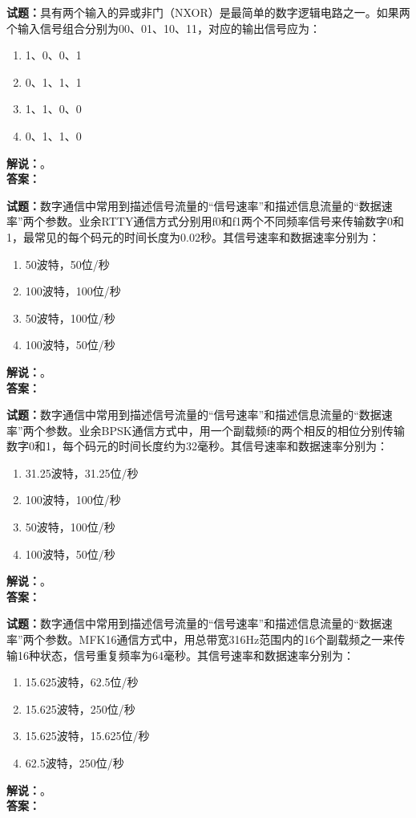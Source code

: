 \documentclass{ctexbook}
\begin{document}
\bigskip




\noindent\textbf{试题：}具有两个输入的异或非门（NXOR）是最简单的数字逻辑电路之一。如果两个输入信号组合分别为00、01、10、11，对应的输出信号应为：
\begin{enumerate}[leftmargin=3em]
\item 1、0、0、1
\item 0、1、1、1
\item 1、1、0、0
\item 0、1、1、0
\end{enumerate}
\noindent\textbf{解说：}\textbf{}。\\\noindent\textbf{答案：}

\bigskip




\noindent\textbf{试题：}数字通信中常用到描述信号流量的“信号速率”和描述信息流量的“数据速率”两个参数。业余RTTY通信方式分别用f0和f1两个不同频率信号来传输数字0和1，最常见的每个码元的时间长度为0.02秒。其信号速率和数据速率分别为：
\begin{enumerate}[leftmargin=3em]
\item 50波特，50位/秒
\item 100波特，100位/秒
\item 50波特，100位/秒
\item 100波特，50位/秒
\end{enumerate}
\noindent\textbf{解说：}\textbf{}。\\\noindent\textbf{答案：}

\bigskip




\noindent\textbf{试题：}数字通信中常用到描述信号流量的“信号速率”和描述信息流量的“数据速率”两个参数。业余BPSK通信方式中，用一个副载频f的两个相反的相位分别传输数字0和1，每个码元的时间长度约为32毫秒。其信号速率和数据速率分别为：
\begin{enumerate}[leftmargin=3em]
\item 31.25波特，31.25位/秒
\item 100波特，100位/秒
\item 50波特，100位/秒
\item 100波特，50位/秒
\end{enumerate}
\noindent\textbf{解说：}\textbf{}。\\\noindent\textbf{答案：}

\bigskip




\noindent\textbf{试题：}数字通信中常用到描述信号流量的“信号速率”和描述信息流量的“数据速率”两个参数。MFK16通信方式中，用总带宽316Hz范围内的16个副载频之一来传输16种状态，信号重复频率为64毫秒。其信号速率和数据速率分别为：
\begin{enumerate}[leftmargin=3em]
\item 15.625波特，62.5位/秒
\item 15.625波特，250位/秒
\item 15.625波特，15.625位/秒
\item 62.5波特，250位/秒
\end{enumerate}
\noindent\textbf{解说：}\textbf{}。\\\noindent\textbf{答案：}
\end{document}
